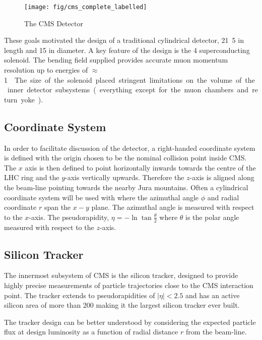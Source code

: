 \begin{figure}
\texttt{[image: fig/cms\_complete\_labelled]}
\caption{The CMS Detector}
\end{figure}

These goals motivated the design of a traditional cylindrical detector,
\unit{21.5}{\metre} in length and \unit{15}{\metre} in diameter. A key feature
of the design is the \unit{4}{\tesla} superconducting solenoid. The bending
field supplied provides accurate muon momentum resolution up to energies of
\unit{$\approx$ 1}{\TeV}. The size of the solenoid placed stringent
limitations on the volume of the inner detector subsystems (everything except
for the muon chambers and return yoke).

\subsection{Coordinate System}
In order to facilitate discussion of the detector, a right-handed coordinate
system is defined with the origin chosen to be the nominal collision point
inside \ac{CMS}. The $x$ axis is then defined to point horizontally inwards
towards the centre of the \ac{LHC} ring and the $y$-axis vertically
upwards. Therefore the $z$-axis is aligned along the beam-line pointing towards
the nearby Jura mountains. Often a cylindrical coordinate system will be used
with where the azimuthal angle $\phi$ and radial coordinate $r$ span the $x-y$
plane. The azimuthal angle is measured with respect to the $x$-axis. The
pseudorapidity, $\eta = - \ln \tan \frac{\theta}{2}$ where $\theta$ is the polar
angle measured with respect to the $z$-axis.

\subsection{Silicon Tracker}
The innermost subsystem of \ac{CMS} is the silicon tracker, designed to provide
highly precise measurements of particle trajectories close to the CMS
interaction point. The tracker extends to pseudorapidities of $|\eta|<2.5$ and
has an active silicon area of more than \unit{200}{\metre\squared} making it the
largest silicon tracker ever built.

The tracker design can be better understood by considering the expected particle
flux at design luminosity as a function of radial distance $r$ from the
beam-line.

